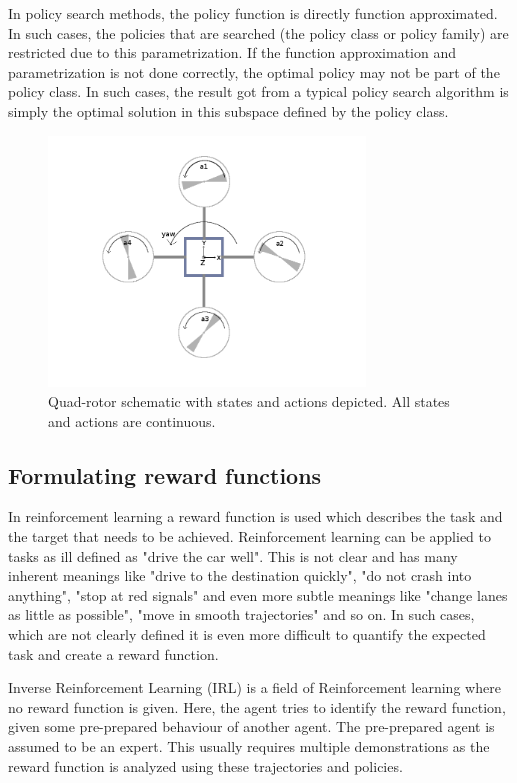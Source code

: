 \documentclass[hidelinks,BTech]{iitmdiss}
\begin{document}
In policy search methods, the policy function is directly function approximated. In such cases, the policies that are searched (the policy class or policy family) are restricted due to this parametrization. If the function approximation and parametrization is not done correctly, the optimal policy may not be part of the policy class. In such cases, the result got from a typical policy search algorithm is simply the optimal solution in this subspace defined by the policy class.

\begin{figure}[H]
  \centering
    \includegraphics[width=0.75\textwidth]{quadrotor_states_actions.png}
    \caption{Quad-rotor schematic with states and actions depicted. All states and actions are continuous.}
\end{figure}

\subsection{Formulating reward functions}

In reinforcement learning a reward function is used which describes the task and the target that needs to be achieved. Reinforcement learning can be applied to tasks as ill defined as "drive the car well". This is not clear and has many inherent meanings like "drive to the destination quickly", "do not crash into anything", "stop at red signals" and even more subtle meanings like "change lanes as little as possible", "move in smooth trajectories" and so on. In such cases, which are not clearly defined it is even more difficult to quantify the expected task and create a reward function.

Inverse Reinforcement Learning (IRL) is a field of Reinforcement learning where no reward function is given. Here, the agent tries to identify the reward function, given some pre-prepared behaviour of another agent. The pre-prepared agent is assumed to be an expert. This usually requires multiple demonstrations as the reward function is analyzed using these trajectories and policies.
\end{document}

